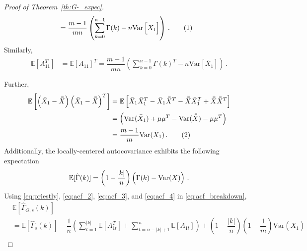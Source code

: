 \documentclass[11pt]{article}
\newcommand{\E}{\mathbb{E}}
\newcommand{\Var}{\text{Var}}
\newcommand\numberthis{\addtocounter{equation}{1}\tag{\theequation}}
\theoremstyle{remark}
\begin{document}
\begin{proof}[Proof of Theorem~\ref{th:G-_expec}]
\begin{align*}
    &= \dfrac{m-1}{mn}\left(\sum_{k=0}^{n-1}\Gamma(k) - n\text{Var}\left[\bar{X}_1 \right]\right)\,. \numberthis \label{eq:acf_2}
\end{align*}
%
Similarly,
%    
\begin{align}
\label{eq:acf_3}
    \mathbb{E} \left[ A_{11}^T \right] &= \mathbb{E}\left[ A_{11}\right]^T = \dfrac{m-1}{mn}\left(\sum_{k=0}^{n-1}\Gamma(k)^T - n\text{Var}\left[\bar{X}_1 \right] \right)\,.
\end{align}


Further,
\begin{align*}
\mathbb{E}\left[ \left(\bar{X}_{1} - \bar{\bar{X}} \right)  \left(\bar{X}_{1} - \bar{\bar{X}} \right)^{T}\right] &= \mathbb{E}\left[ \bar{X}_{1}\bar{X}_{1}^{T} - \bar{X}_{1}\bar{\bar{X}}^{T} - \bar{\bar{X}} \bar{X}_{1}^{T} + \bar{\bar{X}}\bar{\bar{X}}^{T}\right]\\
&= \left(\Var(\bar{X}_{1}) + \mu\mu^{T} - \Var(\bar{\bar{X}}) - \mu\mu^{T}\right)\\
&= \dfrac{m-1}{m}\Var(\bar{X}_1)\,. \numberthis \label{eq:acf_4}
\end{align*}
%
Additionally, the locally-centered autocovariance exhibits the following expectation
 \begin{equation} \label{eq:priestly}
     \mathbb{E}[\hat{\Gamma}(k)] = \left(1- \dfrac{\abs{k}}{n}\right)\left(\Gamma(k) - \Var{(\bar{X})}
 \right)\,.
 \end{equation}
%
Using \eqref{eq:priestly}, \eqref{eq:acf_2}, \eqref{eq:acf_3}, and \eqref{eq:acf_4} in \eqref{eq:acf_breakdown},
\begin{align*}
    & \E \left[\hat{\Gamma}_{G,s}(k) \right] \\
    &= \mathbb{E}\left[\hat{\Gamma}_{s}(k)\right] - \dfrac{1}{n} \left(\sum\limits_{t=1}^{|k|}\mathbb{E}[A_{1t}^T] + \sum\limits_{t=n-|k|+1}^{n}\mathbb{E}[A_{1t}]\right) + \left(1- \dfrac{|k|}{n}\right)\left(1-\dfrac{1}{m}\right)\Var(\bar{X}_1)\\

\end{align*}
\end{proof}
\end{document}
